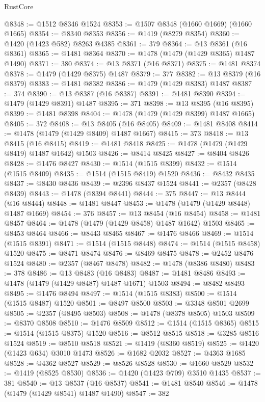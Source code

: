 \begin{lexlean}{RustCore}
\begin{coremodule}
@8348 := @1512 @8346 @1524
@8353 := @1507 @8348 (@1660 @1669) (@1660 @1665)
@8354 := @8340 @8353
@8356 := @1419 (@8279 @8354)
@8360 := @1420 (@1423 @582) @8263 @4385
@8361 := 379
@8364 := @13 @8361 (@16 @8361)
@8365 := @1481 @8364
@8370 := @1478 (@1479 (@1429 @8365) @1487 @1490)
@8371 := 380
@8374 := @13 @8371 (@16 @8371)
@8375 := @1481 @8374
@8378 := @1479 (@1429 @8375) @1487
@8379 := 377
@8382 := @13 @8379 (@16 @8379)
@8383 := @1481 @8382
@8386 := @1479 (@1429 @8383) @1487
@8387 := 374
@8390 := @13 @8387 (@16 @8387)
@8391 := @1481 @8390
@8394 := @1479 (@1429 @8391) @1487
@8395 := 371
@8398 := @13 @8395 (@16 @8395)
@8399 := @1481 @8398
@8404 := @1478 (@1479 (@1429 @8399) @1487 @1665)
@8405 := 372
@8408 := @13 @8405 (@16 @8405)
@8409 := @1481 @8408
@8414 := @1478 (@1479 (@1429 @8409) @1487 @1667)
@8415 := 373
@8418 := @13 @8415 (@16 @8415)
@8419 := @1481 @8418
@8425 := @1478 (@1479 (@1429 @8419) @1487 @1642) @1503
@8426 := @8414 @8425
@8427 := @8404 @8426
@8428 := @1476 @8427
@8430 := @1514 (@1515 @8399)
@8432 := @1514 (@1515 @8409)
@8435 := @1514 (@1515 @8419) @1520
@8436 := @8432 @8435
@8437 := @8430 @8436
@8439 := @2396 @8437 @1524
@8441 := @2357 (@8428 @8439)
@8443 := @1478 (@8394 @8441)
@8444 := 375
@8447 := @13 @8444 (@16 @8444)
@8448 := @1481 @8447
@8453 := @1478 (@1479 (@1429 @8448) @1487 @1669)
@8454 := 376
@8457 := @13 @8454 (@16 @8454)
@8458 := @1481 @8457
@8464 := @1478 (@1479 (@1429 @8458) @1487 @1642) @1503
@8465 := @8453 @8464
@8466 := @8443 @8465
@8467 := @1476 @8466
@8469 := @1514 (@1515 @8391)
@8471 := @1514 (@1515 @8448)
@8474 := @1514 (@1515 @8458) @1520
@8475 := @8471 @8474
@8476 := @8469 @8475
@8478 := @2452 @8476 @1524
@8480 := @2357 (@8467 @8478)
@8482 := @1478 (@8386 @8480)
@8483 := 378
@8486 := @13 @8483 (@16 @8483)
@8487 := @1481 @8486
@8493 := @1478 (@1479 (@1429 @8487) @1487 @1671) @1503
@8494 := @8482 @8493
@8495 := @1476 @8494
@8497 := @1514 (@1515 @8383)
@8500 := @1514 (@1515 @8487) @1520
@8501 := @8497 @8500
@8503 := @3348 @8501 @2699
@8505 := @2357 (@8495 @8503)
@8508 := @1478 (@8378 @8505) @1503
@8509 := @8370 @8508
@8510 := @1476 @8509
@8512 := @1514 (@1515 @8365)
@8515 := @1514 (@1515 @8375) @1520
@8516 := @8512 @8515
@8518 := @3285 @8516 @1524
@8519 := @8510 @8518
@8521 := @1419 (@8360 @8519)
@8525 := @1420 (@1423 @634) @3010 @1473
@8526 := @1682 @2032
@8527 := @4363 @1685
@8528 := @4362 @8527
@8529 := @8526 @8528
@8530 := @1660 @8529
@8532 := @1419 (@8525 @8530)
@8536 := @1420 (@1423 @709) @3510 @1435
@8537 := 381
@8540 := @13 @8537 (@16 @8537)
@8541 := @1481 @8540
@8546 := @1478 (@1479 (@1429 @8541) @1487 @1490)
@8547 := 382

\end{coremodule}
\end{lexlean}
